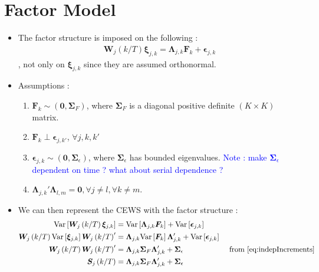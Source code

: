 \documentclass{article}
\numberwithin{equation}{section}
\newcommand{\W}[2]{\bm{W}_{#1}\left(#2/T\right)}
\newcommand{\CEWS}[2]{\bm{S}_{#1}\left(#2/T\right)}
\newcommand{\increment}[2]{\bm{\xi}_{#1,#2}}
\newcommand{\Var}[1]{\mathrm{Var}\left[#1\right]}
\newcommand{\loadings}[2]{\bm{\Lambda}_{#1,#2}}
\newcommand{\factors}[1]{\bm{F}_{#1}}
\newcommand{\idioError}[2]{\bm{\epsilon}_{#1,#2}}
\begin{document}
\section{Factor Model}
	\begin{itemize}
		\item The factor structure is imposed on the following : 
			\begin{align} \label{eq:factorStructure}
				\W{j}{k} \increment{j}{k} = \loadings{j}{k} \factors{k} + \idioError{j}{k}
			\end{align}
			, not only on $\increment{j}{k}$ since they are assumed orthonormal.
		\item Assumptions : 	
			\begin{enumerate}
				\item $\factors{k} \sim (\bm{0}, \bm{\Sigma}_F)$, where $\bm{\Sigma}_F$ is a diagonal positive definite $(K \times K)$ matrix. 
				\item $\factors{k} \perp \idioError{j}{k'}$, $\forall j,k,k'$
				\item $\idioError{j}{k} \sim (\bm{0}, \bm{\Sigma}_{\epsilon})$, where $\bm{\Sigma}_{\epsilon}$ has bounded eigenvalues. \textcolor{blue}{Note : make $\bm{\Sigma}_{\epsilon}$ dependent on time ? what about serial dependence ?}
				\item  $\loadings{j}{k}'\loadings{l}{m} = \bm{0}, \forall j \neq l, \forall k \neq m$. 
			\end{enumerate}
		\item We can then represent the CEWS with the factor structure : 
		\begin{align*}
			\Var{\W{j}{k}\increment{j}{k}}        	    &= \Var{\loadings{j}{k}\factors{k}} + \Var{\idioError{j}{k}} \\
			\W{j}{k} \Var{\increment{j}{k}} \W{j}{k}' &= \loadings{j}{k}\Var{\factors{k}}\loadings{j}{k}' +  \Var{\idioError{j}{k}}\\
			\W{j}{k}\W{j}{k}' &=  \loadings{j}{k}\bm{\Sigma}_{F}\loadings{j}{k}' +  \bm{\Sigma}_{\epsilon} &\text{ from } \eqref{eq:indepIncrements}\\
			\CEWS{j}{k} &= \loadings{j}{k}\bm{\Sigma}_{F}\loadings{j}{k}' +  \bm{\Sigma}_{\epsilon}
		\end{align*}
	\end{itemize}
\end{document}
